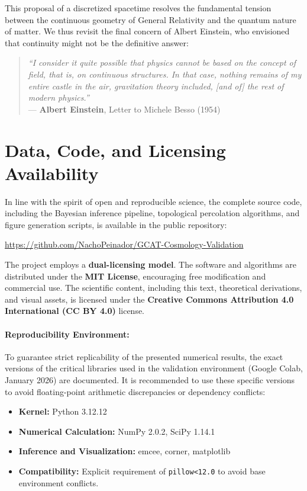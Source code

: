 \documentclass[12pt, a4paper]{article}
\theoremstyle{plain}
\theoremstyle{definition}
\begin{document}
This proposal of a discretized spacetime resolves the fundamental tension between the continuous geometry of General Relativity and the quantum nature of matter. We thus revisit the final concern of Albert Einstein, who envisioned that continuity might not be the definitive answer:

\begin{quote}
\textit{``I consider it quite possible that physics cannot be based on the concept of field, that is, on continuous structures. In that case, nothing remains of my entire castle in the air, gravitation theory included, [and of] the rest of modern physics.''} \\
--- \textbf{Albert Einstein}, Letter to Michele Besso (1954)
\end{quote}

\section*{Data, Code, and Licensing Availability}

In line with the spirit of open and reproducible science, the complete source code, including the Bayesian inference pipeline, topological percolation algorithms, and figure generation scripts, is available in the public repository:

\begin{center}
\url{https://github.com/NachoPeinador/GCAT-Cosmology-Validation}
\end{center}

The project employs a \textbf{dual-licensing model}. The software and algorithms are distributed under the \textbf{MIT License}, encouraging free modification and commercial use. The scientific content, including this text, theoretical derivations, and visual assets, is licensed under the \textbf{Creative Commons Attribution 4.0 International (CC BY 4.0)} license.

\paragraph{Reproducibility Environment:}
To guarantee strict replicability of the presented numerical results, the exact versions of the critical libraries used in the validation environment (Google Colab, January 2026) are documented. It is recommended to use these specific versions to avoid floating-point arithmetic discrepancies or dependency conflicts:
\begin{itemize}
    \item \textbf{Kernel:} Python 3.12.12
    \item \textbf{Numerical Calculation:} NumPy 2.0.2, SciPy 1.14.1
    \item \textbf{Inference and Visualization:} emcee, corner, matplotlib
    \item \textbf{Compatibility:} Explicit requirement of \texttt{pillow<12.0} to avoid base environment conflicts.
\end{itemize}
\end{document}
